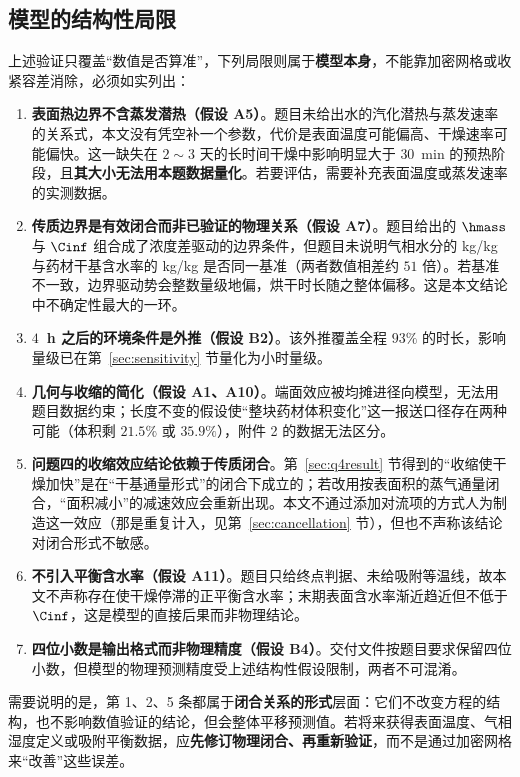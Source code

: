 \subsection{模型的结构性局限}
\label{sec:limitations}

上述验证只覆盖``数值是否算准''，下列局限则属于\textbf{模型本身}，不能靠加密网格或收紧容差消除，必须如实列出：

\begin{enumerate}
  \item \textbf{表面热边界不含蒸发潜热（假设 A5）}。题目未给出水的汽化潜热与蒸发速率的关系式，本文没有凭空补一个参数，代价是表面温度可能偏高、干燥速率可能偏快。这一缺失在 $2\sim3$ 天的长时间干燥中影响明显大于 $30$~min 的预热阶段，且\textbf{其大小无法用本题数据量化}。若要评估，需要补充表面温度或蒸发速率的实测数据。
  \item \textbf{传质边界是有效闭合而非已验证的物理关系（假设 A7）}。题目给出的 $\hmass$ 与 $\Cinf$ 组合成了浓度差驱动的边界条件，但题目未说明气相水分的 kg/kg 与药材干基含水率的 kg/kg 是否同一基准（两者数值相差约 $51$ 倍）。若基准不一致，边界驱动势会整数量级地偏，烘干时长随之整体偏移。这是本文结论中不确定性最大的一环。
  \item \textbf{$4$~h 之后的环境条件是外推（假设 B2）}。该外推覆盖全程 $93\%$ 的时长，影响量级已在第~\ref{sec:sensitivity} 节量化为小时量级。
  \item \textbf{几何与收缩的简化（假设 A1、A10）}。端面效应被均摊进径向模型，无法用题目数据约束；长度不变的假设使``整块药材体积变化''这一报送口径存在两种可能（体积剩 $21.5\%$ 或 $35.9\%$），附件 2 的数据无法区分。
  \item \textbf{问题四的收缩效应结论依赖于传质闭合}。第~\ref{sec:q4result} 节得到的``收缩使干燥加快''是在``干基通量形式''的闭合下成立的；若改用按表面积的蒸气通量闭合，``面积减小''的减速效应会重新出现。本文不通过添加对流项的方式人为制造这一效应（那是重复计入，见第~\ref{sec:cancellation} 节），但也不声称该结论对闭合形式不敏感。
  \item \textbf{不引入平衡含水率（假设 A11）}。题目只给终点判据、未给吸附等温线，故本文不声称存在使干燥停滞的正平衡含水率；末期表面含水率渐近趋近但不低于 $\Cinf$，这是模型的直接后果而非物理结论。
  \item \textbf{四位小数是输出格式而非物理精度（假设 B4）}。交付文件按题目要求保留四位小数，但模型的物理预测精度受上述结构性假设限制，两者不可混淆。
\end{enumerate}

需要说明的是，第 1、2、5 条都属于\textbf{闭合关系的形式}层面：它们不改变方程的结构，也不影响数值验证的结论，但会整体平移预测值。若将来获得表面温度、气相湿度定义或吸附平衡数据，应\textbf{先修订物理闭合、再重新验证}，而不是通过加密网格来``改善''这些误差。
